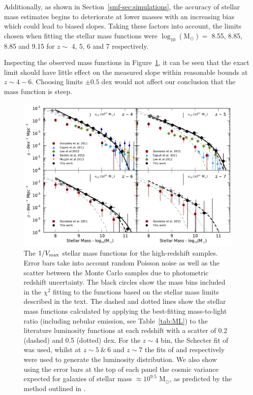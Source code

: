 Additionally, as shown in Section~\ref{smf-sec:simulations}, the accuracy of stellar mass estimates begins to deteriorate at lower masses with an increasing bias which could lead to biased slopes. Taking these factors into account, the limits chosen when fitting the stellar mass functions were $\log_{10} (\text{M}_{\odot}) =$ 8.55, 8.85, 8.85 and 9.15 for $z \sim$ 4, 5, 6 and 7 respectively.

Inspecting the observed mass functions in Figure~\ref{smf-fig:massfunctions}, it can be seen that the exact limit should have little effect on the measured slope within reasonable bounds at $z \sim 4-6$. Choosing limits $\pm 0.5$ dex would not affect our conclusion that the mass function is steep.

\begin{figure}
\centering
\includegraphics[width=\textwidth]{plots/fig9.pdf}
\caption[The $1/V_{\rm{max}}$ stellar mass functions for the high-redshift samples.]{The $1/V_{\rm{max}}$ stellar mass functions for the high-redshift samples. Error bars take into account random Poisson noise as well as the scatter between the Monte Carlo samples due to photometric redshift uncertainty. The black circles show the mass bins included in the $\chi^2$ fitting to the \citet{Schechter:1976gl} functions based on the stellar mass limits described in the text. The dashed and dotted lines show the stellar mass functions calculated by applying the best-fitting mass-to-light ratio (including nebular emission, see Table~\ref{tab:ML}) to the literature luminosity functions at each redshift with a scatter of 0.2 (dashed) and 0.5 (dotted) dex. For the $z\sim4$ bin, the Schecter fit of \citet{2007ApJ...670..928B} was used, whilst at $z\sim5~\&~6$ and $z\sim7$ the fits of \citet{Anonymous:96uKWdy6} and \citet{McLure:2013hh} respectively were used to generate the luminosity distribution. We also show using the error bars at the top of each panel the cosmic variance expected for galaxies of stellar mass $\approx 10^{9.5}$ M$_{\odot}$, as predicted by the method outlined in \citet{Moster:2011ip}.}
\label{smf-fig:massfunctions}
\end{figure}

